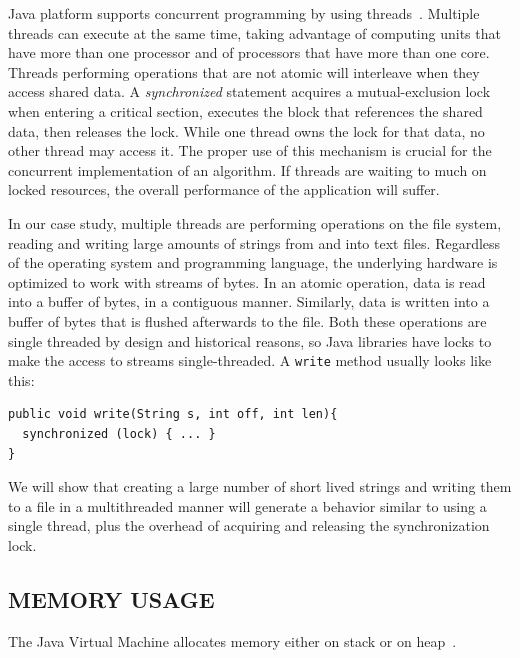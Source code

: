 \documentclass[a4paper,twoside]{article}
\begin{document}
Java platform supports concurrent programming by using threads~\cite{gosling:2014}.
Multiple threads can execute at the same time, taking advantage of computing units that have more than one processor
and of processors that have more than one core.
Threads performing operations that are not atomic will interleave when they access shared data.
A {\textit{synchronized}} statement acquires a mutual-exclusion lock when entering a critical section, executes the
block that references the shared data, then releases the lock.
While one thread owns the lock for that data, no other thread may access it. 
The proper use of this mechanism is crucial for the concurrent implementation of an algorithm.
If threads are waiting to much on locked resources, the overall performance of the application will suffer.

In our case study, multiple threads are performing operations on the file system, reading and writing large amounts of strings from and into text files.
Regardless of the operating system and programming language, the underlying hardware is optimized to work with streams of bytes.
In an atomic operation, data is read into a buffer of bytes, in a contiguous manner.
Similarly, data is written into a buffer of bytes that is flushed afterwards to the file.
Both these operations are single threaded by design and historical reasons, so Java libraries have locks to make the
access to streams single-threaded.
A \texttt{write} method usually looks like this:
\begin{small}
\begin{verbatim}
public void write(String s, int off, int len){
  synchronized (lock) { ... }
}
\end{verbatim}
\end{small}

We will show that creating a large number of short lived strings and writing them to a file in a multithreaded manner
will generate a behavior similar to using a single thread, plus the overhead of acquiring and releasing the synchronization lock.





\subsection{\uppercase{Memory Usage}}
\label{subsec:memory}

The Java Virtual Machine allocates memory either on stack or on heap~\cite{lindholm:2014}.
\end{document}
